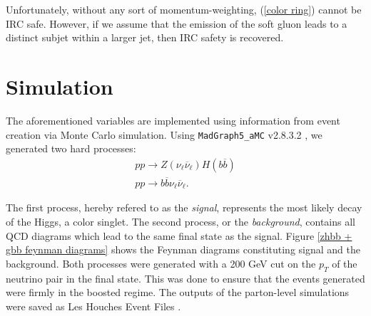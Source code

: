 \documentclass[10pt,a4paper]{book}
\def\code#1{\texttt{#1}}
\begin{document}
Unfortunately, without any sort of momentum-weighting, (\ref{color ring}) cannot be IRC safe. However, if we assume that the emission of the soft gluon leads to a distinct subjet within a larger jet, then IRC safety is recovered.

\section{Simulation}
\label{Simulation}

The aforementioned variables are implemented using information from event creation via Monte Carlo simulation. Using \code{MadGraph5\_aMC} v2.8.3.2 \cite{Alwall:2014hca}, we generated two hard processes:
\begin{gather}
p p \rightarrow Z(\nu_\ell \overline{\nu}_\ell) H(b\overline{b}) \\
p p \rightarrow b\overline{b} \nu_\ell \overline{\nu}_\ell.
\end{gather}

The first process, hereby refered to as the \emph{signal}, represents the most likely decay of the Higgs, a color singlet. The second process, or the \emph{background}, contains all QCD diagrams which lead to the same final state as the signal. Figure \ref{zhbb + gbb feynman diagrams} shows the Feynman diagrams constituting signal and the background. Both processes were generated with a 200 GeV cut on the $p_T$ of the neutrino pair in the final state. This was done to ensure that the events generated were firmly in the boosted regime. The outputs of the parton-level simulations were saved as Les Houches Event Files \cite{Alwall:2006yp}.
\end{document}
